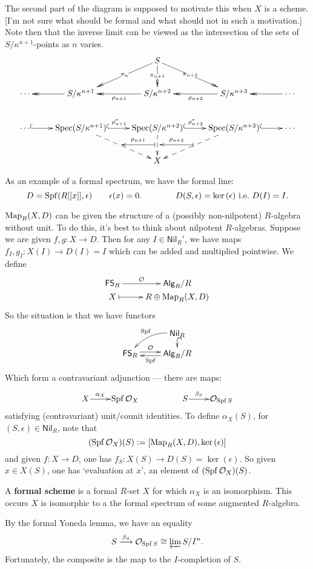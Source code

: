\documentclass[11pt]{article}
\newcommand{\RAlg}{\mathsf{Alg}_R}
\newcommand{\RNil}{\mathsf{Nil}_R}
\newcommand{\FSR}{\mathsf{FS}_R}
\DeclareMathOperator{\SPf}{Spf}
\begin{document}
\begin{itemise}
The second part of the diagram is supposed to motivate this when $X$ is a scheme. [I'm not sure what should be formal and what should not in such a motivation.] Note then that the inverse limit can be viewed as the intersection of the sets of $S/\kappa^{n+1}$-points as $n$ varies.
\[\xymatrix{
&%
&%
S
\ar@{->>}[d]|-{\pi_{n+1}}
\ar@{->>}[dl]|-{\pi_{n}}
\ar@{->>}[dr]|-{\pi_{n+2}}
&%
&%
\\%
\cdots 
&%
S/\kappa^{n+1}
\ar@{->>}[l]
&%
S/\kappa^{n+2}
\ar@{->>}[l]^-{\rho_{n+1}}
&%
S/\kappa^{n+3}
\ar@{->>}[l]^-{\rho_{n+2}}
&%
\cdots 
\ar@{->>}[l]
\\%
\cdots 
&%
\Spec(S/\kappa^{n+1})
\ar@{^{(}->}[l];[]
\ar@{-->}[dr]^{}="1"_{}="2"
&%
\Spec(S/\kappa^{n+2})
\ar@{^{(}->}[l];[]^-{\rho_{n+1}^*}
\ar@{-->}[d]^{}="3"_{}="4"
&%
\Spec(S/\kappa^{n+3})
\ar@{^{(}->}[l];[]^-{\rho_{n+2}^*}
\ar@{-->}[dl]^{}="5"_{}="6"
&%
\cdots 
\ar@{^{(}->}[l];[]
\\
&&X
\ar@{|->}"3";"2"_-{\rho_{n+1}}
\ar@{|->}"5";"4"_-{\rho_{n+2}}
}\]
\item As an example of a formal spectrum, we have the formal line:
\[D=\SPf(R[[x]],\epsilon)\qquad \epsilon(x)=0.\qquad \qquad D(S,\epsilon)=\ker(\epsilon)\textup{ i.e.\ }D(I)=I.\]
\item $\operatorname{Map}_R(X,D)$ can be given the structure of a (possibly non-nilpotent) $R$-algebra without unit. To do this, it's best to think about nilpotent $R$-algebras. Suppose we are given $f,g:X\to D$. Then for any $I\in\RNil'$, we have maps $f_I,g_I:X(I)\to D(I)=I$ which can be added and multiplied pointwise. We define
\[\xymatrix@R=0mm{
\ar[r]^-{\calO}%
\FSR&%
\RAlg/R\\%
X%
\ar@{|->}[r]&
R\oplus \Map_R(X,D)%
}\]
So the situation is that we have functors
\[\xymatrix@R=.3cm{
&%
\RNil
\ar@/_1em/[ld]_-{\SPf}
\ar@{^{(}->}[d]
\\%
\FSR
\ar@<+.51ex>[r]^-{\calO}
&%
\RAlg/R
\ar@<+.51ex>[l]^-{\SPf}
}\]
Which form a contravariant adjunction --- there are maps:
\[
\vcenter{\xymatrix@1{
X
\ar[r]^-{\alpha_X}
&%
\SPf\calO_X
&%
&%
S
\ar[r]^-{\beta_S}
&%
\calO_{\SPf S}
}}\]
satisfying (contravariant) unit/counit identities.
To define $\alpha_X(S)$, for $(S,\epsilon)\in\RNil$, note that
\[(\SPf\calO_X)(S):=[\Map_R(X,D),\ker(\epsilon)]\]
and given $f:X\to D$, one has $f_S:X(S)\to D(S)=\ker(\epsilon)$. So given $x\in X(S)$, one has `evaluation at $x$', an element of $(\SPf\calO_X)(S)$. 
\item A \textbf{formal scheme} is a formal $R$-set $X$ for which $\alpha_X$ is an isomorphism. This occurs \Iff $X$ is isomorphic to a the formal spectrum of some augmented $R$-algebra.
\item By the formal Yoneda lemma, we have an equality
\[S\overset{\beta_S}{\to}\calO_{\SPf S}\cong \varprojlim S/I^n.\]
Fortunately, the composite is the map to the $I$-completion of $S$.
\end{itemise}
\end{document}
